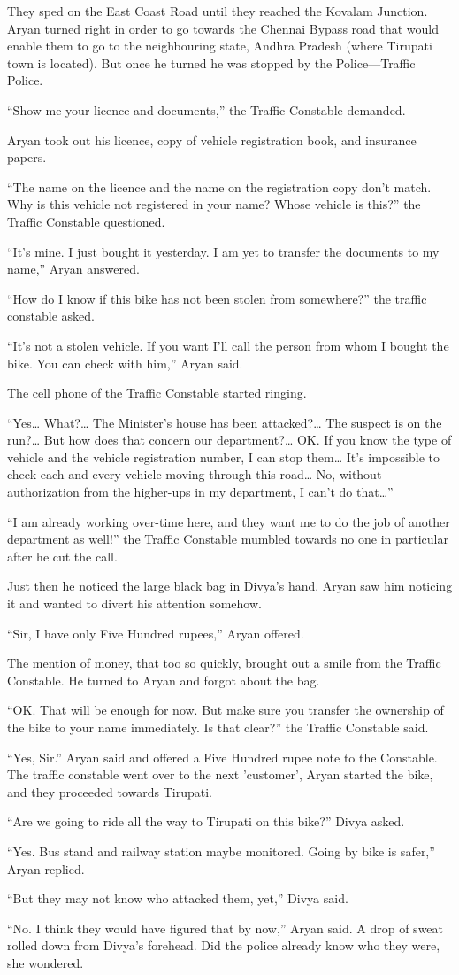 They sped on the East Coast Road until they reached the Kovalam Junction. Aryan
turned right in order to go towards the Chennai Bypass road that would enable
them to go to the neighbouring state, Andhra Pradesh (where Tirupati town is
located). But once he turned he was stopped by the Police—Traffic Police.

“Show me your licence and documents,” the Traffic Constable demanded.

Aryan took out his licence, copy of vehicle registration book, and insurance
papers.

“The name on the licence and the name on the registration copy don't match. Why
is this vehicle not registered in your name? Whose vehicle is this?” the Traffic
Constable questioned.

“It's mine. I just bought it yesterday. I am yet to transfer the documents to my
name,” Aryan answered.

“How do I know if this bike has not been stolen from somewhere?” the traffic
constable asked.

“It's not a stolen vehicle. If you want I'll call the person from whom I bought
the bike. You can check with him,” Aryan said.

The cell phone of the Traffic Constable started ringing.

“Yes… What?… The Minister's house has been attacked?… The suspect is on
the run?… But how does that concern our department?… OK. If you know the
type of vehicle and the vehicle registration number, I can stop them… It's
impossible to check each and every vehicle moving through this road… No,
without authorization from the higher-ups in my department, I can't do that…”

“I am already working over-time here, and they want me to do the job of another
department as well!” the Traffic Constable mumbled towards no one in particular
after he cut the call.

Just then he noticed the large black bag in Divya's hand. Aryan saw him noticing
it and wanted to divert his attention somehow.

“Sir, I have only Five Hundred rupees,” Aryan offered.

The mention of money, that too so quickly, brought out a smile from the Traffic
Constable. He turned to Aryan and forgot about the bag.

“OK. That will be enough for now. But make sure you transfer the ownership of
the bike to your name immediately. Is that clear?” the Traffic Constable said.

“Yes, Sir.” Aryan said and offered a Five Hundred rupee note to the Constable.
The traffic constable went over to the next 'customer', Aryan started the bike,
and they proceeded towards Tirupati.

“Are we going to ride all the way to Tirupati on this bike?” Divya asked.

“Yes. Bus stand and railway station maybe monitored. Going by bike is safer,”
Aryan replied.

“But they may not know who attacked them, yet,” Divya said.

“No. I think they would have figured that by now,” Aryan said. A drop of sweat
rolled down from Divya's forehead. Did the police already know who they were,
she wondered.